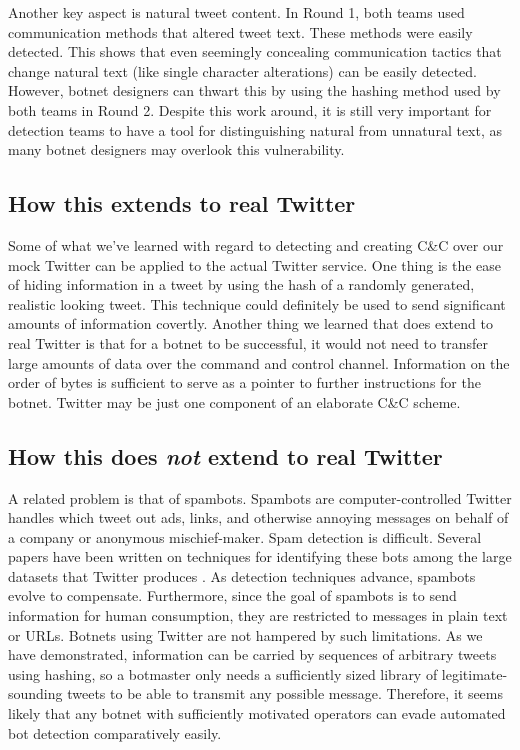 \documentclass[11pt, oneside]{article} %
\numberwithin{equation}{section} %
\numberwithin{figure}{section} %
\numberwithin{table}{section} %
\begin{document}
		Another key aspect is natural tweet content. In Round 1, both teams used communication methods that altered tweet text. These methods were easily detected. This shows that even seemingly concealing communication tactics that change natural text (like single character alterations) can be easily detected. However, botnet designers can thwart this by using the hashing method used by both teams in Round 2. Despite this work around, it is still very important for detection teams to have a tool for distinguishing natural from unnatural text, as many botnet designers may overlook this vulnerability.

	\subsection{How this extends to real Twitter}
	Some of what we've learned with regard to detecting and creating C\&C over our mock Twitter can be applied to the actual Twitter service. One thing is the ease of hiding information in a tweet by using the hash of a randomly generated, realistic looking tweet. This technique could definitely be used to send significant amounts of information covertly. Another thing we learned that does extend to real Twitter is that for a botnet to be successful, it would not need to transfer large amounts of data over the command and control channel. Information on the order of bytes is sufficient to serve as a pointer to further instructions for the botnet. Twitter may be just one component of an elaborate C\&C scheme.

	\subsection{How this does \textit{not} extend to real Twitter}
    A related problem is that of spambots. Spambots are computer-controlled Twitter handles which tweet out ads, links, and otherwise annoying messages on behalf of a company or anonymous mischief-maker. Spam detection is difficult. Several papers have been written on techniques for identifying these bots among the large datasets that Twitter produces \cite{botdetect, spambotML, socialnet_spam}. As detection techniques advance, spambots evolve to compensate. Furthermore, since the goal of spambots is to send information for human consumption, they are restricted to messages in plain text or URLs. Botnets using Twitter are not hampered by such limitations. As  we have demonstrated, information can be carried by sequences of arbitrary  tweets using hashing, so a botmaster only needs a sufficiently sized  library of legitimate-sounding tweets to be able to transmit any possible message. Therefore, it seems likely that any botnet with sufficiently motivated operators can evade automated bot detection comparatively easily.
 
\end{document}
